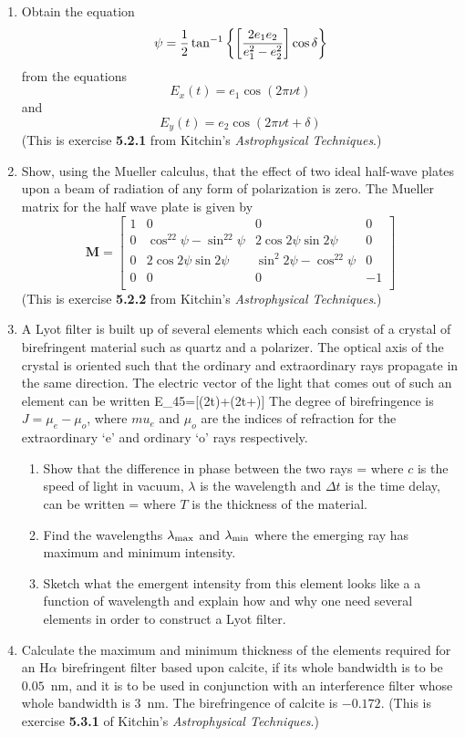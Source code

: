\begin{enumerate}
\item Obtain the equation 
\[ \psi={1\over 2}\tan^{-1}\left\{\left[{2e_1e_2\over e_1^2-e_2^2}\right]\cos\delta\right\} \]
from the equations
\[ E_x(t)=e_1\cos(2\pi\nu t) \]
and
\[ E_y(t)=e_2\cos(2\pi\nu t+\delta) \]
(This is exercise {\bf 5.2.1} from Kitchin's {\it Astrophysical Techniques}.)
\item Show, using the Mueller calculus, that the effect of two ideal half-wave 
plates upon a beam of radiation of any form of polarization is
zero. The Mueller matrix for the half wave plate is given by 
\[
\mathbf{M}=\left[\begin{array}{cccc}
1 & 0 & 0 & 0 \\
0 & \cos^22\psi-\sin^22\psi & 2\cos 2\psi\sin 2\psi & 0 \\
0 & 2\cos 2\psi\sin 2\psi & \sin^2 2\psi-\cos^22\psi & 0 \\
0 & 0 & 0 & -1 \\ \end{array}\right]
\]
(This is exercise {\bf 5.2.2} from Kitchin's {\it Astrophysical
  Techniques}.)
\item A Lyot filter is built up of several elements which each consist
  of a crystal of birefringent material such as quartz and a
  polarizer. The optical axis of the crystal is oriented such that the
  ordinary and extraordinary rays propagate in the same direction. The
  electric vector of the light that comes out of such an element can
  be written
\be
E_{45}=[\cos(2\pi\nu t)+\cos(2\pi\nu t+\delta)]
\ee
The degree of birefringence is $J=\mu_e-\mu_o$, where $mu_e$ and
$\mu_o$ are the indices of refraction for the extraordinary `e' and
ordinary `o' rays respectively.
\begin{enumerate}
\item Show that the difference in phase between the two rays 
\be
\delta=
\ee
where $c$ is the speed of light in vacuum, $\lambda$ is the wavelength
and $\Delta t$ is the time delay, can be written
\be
\delta=
\ee
where $T$ is the thickness of the material. 
\item Find the wavelengths $\lambda_{\rm max}$ and $\lambda_{\rm min}$ where
the emerging ray has maximum and minimum intensity.
\item Sketch what the emergent intensity from this element looks like
  a a function of wavelength and explain how and why one need several
  elements in order to construct a Lyot filter.
\end{enumerate}
\item Calculate the maximum and minimum thickness of the elements required
for an H$\alpha$ birefringent filter based upon calcite, if its whole 
bandwidth is to be $0.05$~nm, and it is to be used in conjunction with an
interference filter whose whole bandwidth is 3~nm. The birefringence of 
calcite is $-0.172$.
(This is exercise {\bf 5.3.1} of Kitchin's {\it Astrophysical Techniques}.) 
\end{enumerate}

%
